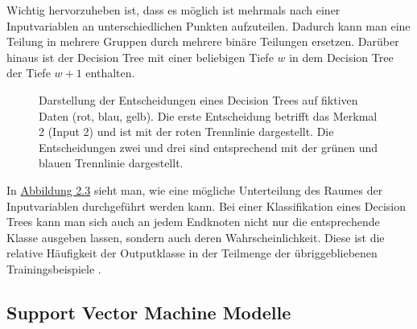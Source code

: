 Wichtig hervorzuheben ist, dass es m\"oglich ist mehrmals nach einer Inputvariablen an unterschiedlichen Punkten aufzuteilen. 
Dadurch kann man eine Teilung in mehrere Gruppen durch mehrere bin\"are Teilungen ersetzen.
Dar\"uber hinaus ist der Decision Tree mit einer beliebigen Tiefe $w$ in dem Decision Tree der Tiefe $w + 1$ enthalten. \\

\begin{figure}[ht]
  \label{fig:rf2}
  \begin{center}
    \begin{tiny}
    \end{tiny}
  \end{center}
  \caption[Regression eines Random Forest Modells]
    {Darstellung der Entscheidungen eines Decision Trees auf fiktiven Daten (rot, blau, gelb). Die erste Entscheidung 
    betrifft das Merkmal 2 (Input 2) und ist mit der roten Trennlinie dargestellt. Die Entscheidungen zwei und drei sind 
    entsprechend mit der gr\"unen und blauen Trennlinie dargestellt.}
\end{figure}



In \hyperref[fig:rf2]{Abbildung 2.3} sieht man, wie eine m\"ogliche Unterteilung des 
Raumes der Inputvariablen durchgef\"uhrt werden kann. Bei einer Klassifikation eines Decision Trees kann man sich auch an jedem Endknoten nicht nur die entsprechende Klasse 
ausgeben lassen, sondern auch deren Wahrscheinlichkeit. Diese ist die relative H\"aufigkeit der Outputklasse in der Teilmenge der \"ubriggebliebenen Trainingsbeispiele \cite{sklearn}.  \\ 






























\subsection{Support Vector Machine Modelle}

